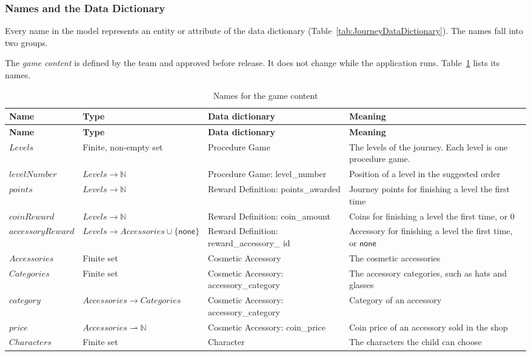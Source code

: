 \documentclass[12pt]{article}
\newcommand{\val}[1]{\ensuremath{\mathsf{#1}}}
\begin{document}
\subsubsection{Names and the Data Dictionary}
\label{sec_FormalNames}

Every name in the model represents an entity or attribute of the data
dictionary (Table~\ref{tab:JourneyDataDictionary}). The names fall into two
groups.

The \emph{game content} is defined by the team and approved before release. It
does not change while the application runs. Table~\ref{tab:ModelContent} lists
its names.

{\small
\begin{longtable}{>{\raggedright\arraybackslash}p{}>{\raggedright\arraybackslash}p{}>{\raggedright\arraybackslash}p{}>{\raggedright\arraybackslash}p{}}
\caption{Names for the game content}
\label{tab:ModelContent}\\
\toprule
\textbf{Name} & \textbf{Type} & \textbf{Data dictionary} & \textbf{Meaning}\\
\midrule
\endfirsthead
\toprule
\textbf{Name} & \textbf{Type} & \textbf{Data dictionary} & \textbf{Meaning}\\
\midrule
\endhead
$\mathit{Levels}$ & Finite, non-empty set & Procedure Game & The levels of the
  journey. Each level is one procedure game.\\[3pt]
$\mathit{levelNumber}$ & $\mathit{Levels} \to \mathbb{N}$ & Procedure Game:
  level\_number & Position of a level in the suggested order\\[3pt]
$\mathit{points}$ & $\mathit{Levels} \to \mathbb{N}$ & Reward Definition:
  points\_awarded & Journey points for finishing a level the first
  time\\[3pt]
$\mathit{coinReward}$ & $\mathit{Levels} \to \mathbb{N}$ & Reward Definition:
  coin\_amount & Coins for finishing a level the first time, or $0$\\[3pt]
$\mathit{accessoryReward}$ & $\mathit{Levels} \to \mathit{Accessories} \cup
  \{\val{none}\}$ & Reward Definition: reward\_\allowbreak accessory\_\allowbreak
  id & Accessory for finishing a level the first time, or \val{none}\\[3pt]
$\mathit{Accessories}$ & Finite set & Cosmetic Accessory & The cosmetic
  accessories\\[3pt]
$\mathit{Categories}$ & Finite set & Cosmetic Accessory: accessory\_category &
  The accessory categories, such as hats and glasses\\[3pt]
$\mathit{category}$ & $\mathit{Accessories} \to \mathit{Categories}$ &
  Cosmetic Accessory: accessory\_category & Category of an accessory\\[3pt]
$\mathit{price}$ & $\mathit{Accessories} \rightharpoonup \mathbb{N}$ &
  Cosmetic Accessory: coin\_price & Coin price of an accessory sold in the
  shop\\[3pt]
$\mathit{Characters}$ & Finite set & Character & The characters the child can
  choose\\
\bottomrule
\end{longtable}
}
\end{document}
